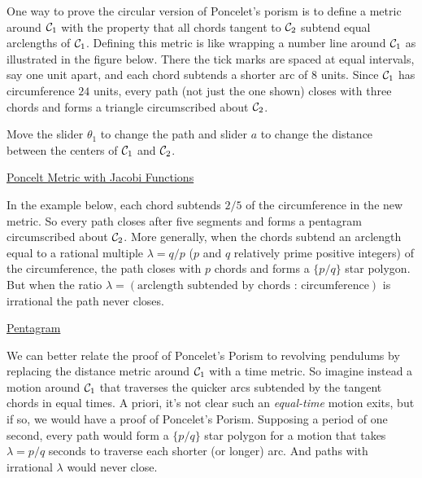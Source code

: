 \documentclass{ximera}
\begin{document}
One way to prove the circular version of Poncelet's porism is to define a metric around ${\cal C}_1$ with the property that all chords tangent to ${\cal C}_2$ subtend equal arclengths of ${\cal C}_1$. Defining this metric is like wrapping a number line around ${\cal C}_1$ as illustrated in the figure below. There the tick marks are spaced at equal intervals, say one unit apart, and each chord subtends a shorter arc of $8$ units. Since ${\cal C}_1$ has circumference $24$ units, every path (not just the one shown) closes with three chords and forms a triangle circumscribed about ${\cal C}_2$.  

\begin{exploration}
Move the slider $\theta_1$ to change the path and slider $a$ to change the distance between the centers of ${\cal C}_1$ and ${\cal C}_2$.
 
\begin{onlineOnly}
    \begin{center}
\end{center}
\end{onlineOnly}

\href{https://www.desmos.com/calculator/wzctareiln}{Poncelt Metric with Jacobi Functions}

\end{exploration}

In the example below, each chord subtends $2/5$ of the circumference in the new metric. So every path closes after five segments and forms a pentagram circumscribed about ${\cal C}_2$. More generally, when the chords subtend an arclength equal to a rational multiple $\lambda = q/p$ ($p$ and $q$ relatively prime positive integers) of the circumference, the path closes with $p$ chords and forms a $\{p/q \}$ star polygon. But when the ratio $\lambda = (\text{arclength subtended by chords : circumference})$ is irrational the path never closes.

\begin{exploration}
\begin{onlineOnly}
    \begin{center}
\end{center}
\end{onlineOnly}

\href{https://www.desmos.com/calculator/qco4rghhfi}{Pentagram}

\end{exploration}

We can better relate the proof of Poncelet's Porism to revolving pendulums by replacing the distance metric around ${\cal C}_1$ with a time metric. So imagine instead a motion around ${\cal C}_1$ that traverses the quicker arcs subtended by the tangent chords in equal times. A priori, it's not clear such an \emph{equal-time} motion exits, but if so, we would have a proof of Poncelet's Porism. Supposing a period of one second, every path would form a $\{p/q \}$ star polygon for a motion that takes $\lambda = p/q$ seconds to traverse each shorter (or longer) arc. And paths with irrational $\lambda$ would never close. 
\end{document}
